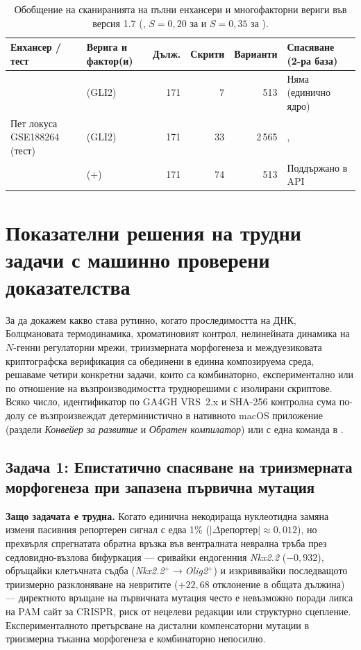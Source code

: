 \documentclass[10.5pt,a4paper]{article}
\begin{document}
\begin{table}[tb]
\small
\caption{Обобщение на сканиранията на пълни енхансери и многофакторни вериги във версия 1.7 (, $S=0{,}20$ за  и $S=0{,}35$ за ).}\label{tab:circuit}
\begin{tabular}{@{}L{41mm}L{38mm}rrrL{22mm}@{}}
\toprule
Енхансер / тест & Верига и фактор(и) & Дълж. & Скрити & Варианти & Спасяване (2-ра база) \\
\midrule
{} &  (GLI2) & 171 & 7 & 513 & Няма (единично ядро) \\
Пет локуса GSE188264 (тест) &  (GLI2) & 171 & 33 & 2\,565 & ,  \\
 &  (+) & 171 & 74 & 513 & Поддържано в API \\
\bottomrule
\end{tabular}
\end{table}

\section{Показателни решения на трудни задачи с машинно проверени доказателства}\label{sec:showcases}

За да докажем какво става рутинно, когато проследимостта на ДНК, Болцмановата термодинамика, хроматиновият контрол, нелинейната динамика на $N$-генни регулаторни мрежи, триизмерната морфогенеза и междуезиковата криптографска верификация са обединени в единна композируема среда, решаваме четири конкретни задачи, които са комбинаторно, експериментално или по отношение на възпроизводимостта труднорешими с изолирани скриптове. Всяко число, идентификатор по GA4GH VRS~2.x и SHA-256 контролна сума по-долу се възпроизвеждат детерминистично в нативното macOS приложение (раздели \emph{Конвейер за развитие} и \emph{Обратен компилатор}) или с една команда в .

\subsection{Задача 1: Епистатично спасяване на триизмерната морфогенеза при запазена първична мутация}

\textbf{Защо задачата е трудна.} Когато единична некодираща нуклеотидна замяна изменя пасивния репортерен сигнал с едва 1\% ($|\Delta\text{репортер}|\approx 0{,}012$), но прехвърля спрегнатата обратна връзка във вентралната неврална тръба през седловидно-възлова бифуркация — сривайки ендогенния \emph{Nkx2.2} ($-0{,}932$), обръщайки клетъчната съдба (\emph{Nkx2.2}$^+\rightarrow$\emph{Olig2}$^+$) и изкривявайки последващото триизмерно разклоняване на невритите ($+22{,}68$ отклонение в общата дължина) — директното връщане на първичната мутация често е невъзможно поради липса на PAM сайт за CRISPR, риск от нецелеви редакции или структурно сцепление. Експерименталното претърсване на дистални компенсаторни мутации в триизмерна тъканна морфогенеза е комбинаторно непосилно.
\end{document}

